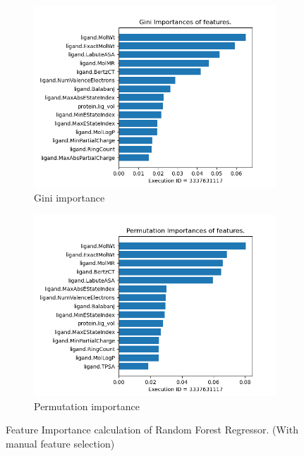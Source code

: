 \documentclass[11pt]{article}
\begin{document}
\begin{figure}
     \centering
     \begin{subfigure}[b]{0.45\textwidth}
         \centering
         \includegraphics[scale=0.45]{images/Gini_importance}
         \caption{Gini importance}
        \label{fig:GiniImportanceLabel}
     \end{subfigure}
     \hfill
     \begin{subfigure}[b]{0.45\textwidth}
         \centering
         \includegraphics[scale=0.45]{images/Permutation_importance}
        \caption{Permutation importance}
        \label{fig:PermutationImportanceLabel}
     \end{subfigure}
     \caption{Feature Importance calculation of Random Forest Regressor.  (With manual feature selection)}
     \label{fig:RFMFILable}
\end{figure}
\end{document}
